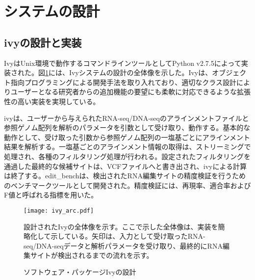 \section{システムの設計}
\subsection{ivyの設計と実装}
IvyはUnix環境で動作するコマンドラインツールとしてPython v2.7.5によって実装された。図\ref{fig:ivy_arch}には、Ivyシステムの設計の全体像を示した。Ivyは、オブジェクト指向プログラミングによる開発手法を取り入れており、適切なクラス設計によりユーザーとなる研究者からの追加機能の要望にも柔軟に対応できるような拡張性の高い実装を実現している。
\par
ivyは、ユーザーから与えられたRNA-seq/DNA-seqのアラインメントファイルと参照ゲノム配列を解析のパラメータを引数として受け取り、動作する。基本的な動作として、受け取った引数から参照ゲノム配列の一塩基ごとにアラインメント結果を解析する。一塩基ごとのアラインメント情報の取得は、ストリーミングで処理され、各種のフィルタリング処理が行われる。設定されたフィルタリングを通過した最終的な候補サイトは、VCFファイルへと書き出され、ivyによる計算は終了する。edit\_benchは、検出されたRNA編集サイトの精度検証を行うためのベンチマークツールとして開発された。精度検証には、再現率、適合率およびF値と呼ばれる指標を用いた。
\begin{figure}[!h]
	\begin{center}
		\texttt{[image: ivy\_arc.pdf]}
	\end{center}
	\vspace*{-1cm}
	\caption{ソフトウェア・パッケージIvyの設計}
	\label{fig:ivy_arch}
	\begin{flushleft}
		\small{設計されたIvyの全体像を示す。ここで示した全体像は、実装を簡略化して示している。矢印は、入力として受け取ったRNA-seq/DNA-seqデータと解析パラメータを受け取り、最終的にRNA編集サイトが検出されるまでの流れを示す。}
	\end{flushleft}
\end{figure}

